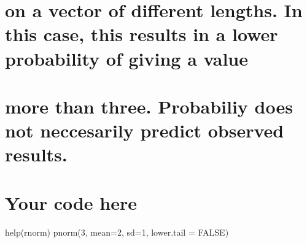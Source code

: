 \documentclass[]{article}
\begin{document}
\section{on a vector of different lengths. In this case, this results in
a lower probability of giving a
value}\label{on-a-vector-of-different-lengths.-in-this-case-this-results-in-a-lower-probability-of-giving-a-value}

\section{more than three. Probabiliy does not neccesarily predict
observed
results.}\label{more-than-three.-probabiliy-does-not-neccesarily-predict-observed-results.}

\section{Your code here}\label{your-code-here-4}

help(rnorm) pnorm(3, mean=2, sd=1, lower.tail = FALSE)
\end{document}
